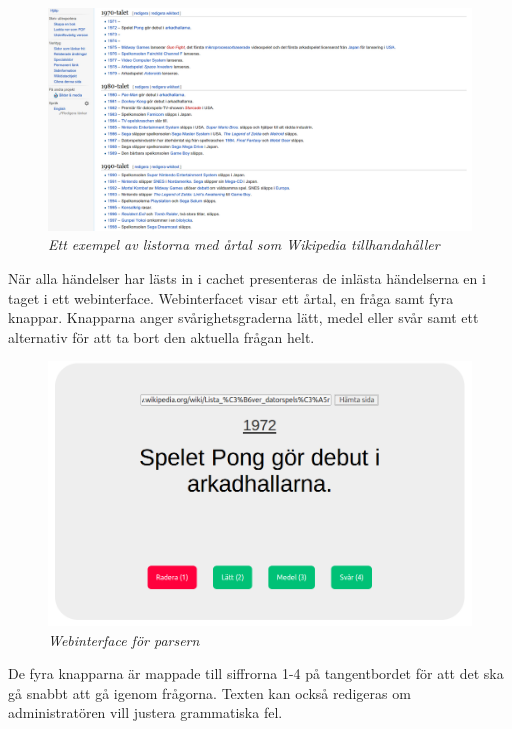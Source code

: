 \documentclass[a4paper, 11pt]{article}
\begin{document}
\begin{figure}[H]
	\begin{centering}
	\includegraphics[width=\textwidth]{Listbild} 
	\end{centering}
	\caption{\textit{Ett exempel av listorna med årtal som Wikipedia tillhandahåller}}
\end{figure}

När alla  händelser har lästs in i cachet presenteras de inlästa händelserna en i taget i ett webinterface. Webinterfacet visar ett årtal, en fråga samt fyra knappar. Knapparna anger svårighetsgraderna lätt, medel eller svår samt ett alternativ för att ta bort den aktuella frågan helt.

\begin{figure}[H]
	\begin{centering}
	\includegraphics[width=\textwidth]{crawler} 
	\end{centering}
	\caption{\textit{Webinterface för parsern}}
\end{figure}

De fyra knapparna är mappade till siffrorna 1-4 på tangentbordet för att det ska gå snabbt att gå igenom frågorna. Texten kan också redigeras om administratören vill justera grammatiska fel.
\end{document}
